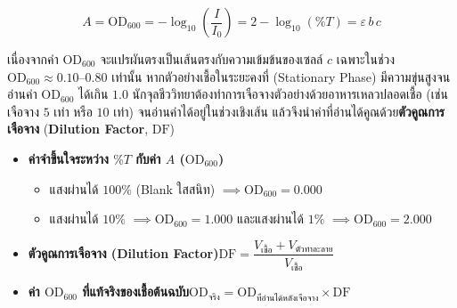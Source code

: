 \begin{equation}
    A = \text{OD}_{600} = -\log_{10}\left(\frac{I}{I_0}\right) = 2 - \log_{10}(\%T) = \varepsilon\,b\,c
    \label{eq:lab12_beer}
\end{equation}

เนื่องจากค่า $\text{OD}_{600}$ จะแปรผันตรงเป็นเส้นตรงกับความเข้มข้นของเซลล์ $c$ เฉพาะในช่วง $\text{OD}_{600} \approx 0.10\text{--}0.80$ เท่านั้น หากตัวอย่างเชื้อในระยะคงที่ (Stationary Phase) มีความขุ่นสูงจนอ่านค่า $\text{OD}_{600}$ ได้เกิน $1.0$ นักจุลชีววิทยาต้องทำการเจือจางตัวอย่างด้วยอาหารเหลวปลอดเชื้อ (เช่น เจือจาง $5$ เท่า หรือ $10$ เท่า) จนอ่านค่าได้อยู่ในช่วงเชิงเส้น แล้วจึงนำค่าที่อ่านได้คูณด้วย\textbf{ตัวคูณการเจือจาง} (\textbf{Dilution Factor}, $\text{DF}$)

\begin{conceptbox}
\begin{itemize}
    \item \textbf{ค่าจำขึ้นใจระหว่าง $\%T$ กับค่า $A$ ($\text{OD}_{600}$)}
    \begin{itemize}
        \item แสงผ่านได้ $100\%$ (Blank ใสสนิท) $\implies \text{OD}_{600} = 0.000$
        \item แสงผ่านได้ $10\%$ $\implies \text{OD}_{600} = 1.000$ \quad และแสงผ่านได้ $1\%$ $\implies \text{OD}_{600} = 2.000$
    \end{itemize}
    \item \textbf{ตัวคูณการเจือจาง (Dilution Factor)}\quad $\text{DF} = \dfrac{V_{\text{เชื้อ}} + V_{\text{ตัวทำละลาย}}}{V_{\text{เชื้อ}}}$
    \item \textbf{ค่า $\text{OD}_{600}$ ที่แท้จริงของเชื้อต้นฉบับ}\quad $\text{OD}_{\text{จริง}} = \text{OD}_{\text{ที่อ่านได้หลังเจือจาง}} \times \text{DF}$
\end{itemize}
\end{conceptbox}

